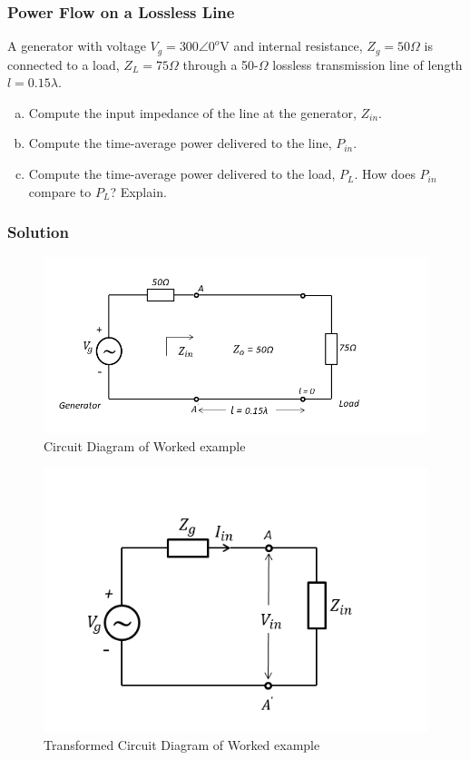 \begin{exmp}
\subsubsection*{Power Flow on a Lossless Line}
A generator with voltage $V_g = 300\angle0^o$V and internal resistance, $Z_g = 50\varOmega$ is connected to a load, $Z_L = 75\varOmega$ through a 50-$\varOmega$ lossless transmission line of length $l = 0.15\lambda$.
\begin{enumerate}[(a)]
\item Compute the input impedance of the line at the generator, $Z_{in}$.
\item Compute the time-average power delivered to the line, $P_{in}$.
\item Compute the time-average power delivered to the load, $P_L$. How does $P_{in}$ compare to $P_L$? Explain.
\end{enumerate}

\subsubsection*{Solution}
\begin{figure}[h]
\centering
\includegraphics[width=1.2\linewidth]{./graphics/power_problem}
\caption{Circuit Diagram of Worked example}
\label{fig:powerproblem}
\end{figure}
\begin{figure}[h]
\centering
\includegraphics[width=1\linewidth]{./graphics/power_problem2}
\caption{Transformed Circuit Diagram of Worked example}
\label{fig:powerproblem2}
\end{figure}


\end{exmp}
